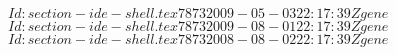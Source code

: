 \documentclass{extex-doc}
\begin{document}

\SVN$Id: section-ide-shell.tex 7873 2009-05-03 22:17:39Z gene $
\SVN$Id: section-ide-shell.tex 7873 2009-08-01 22:17:39Z gene $
\SVN$Id: section-ide-shell.tex 7873 2008-08-02 22:17:39Z gene $

\typeout{--- \SVNdate}
\end{document}
